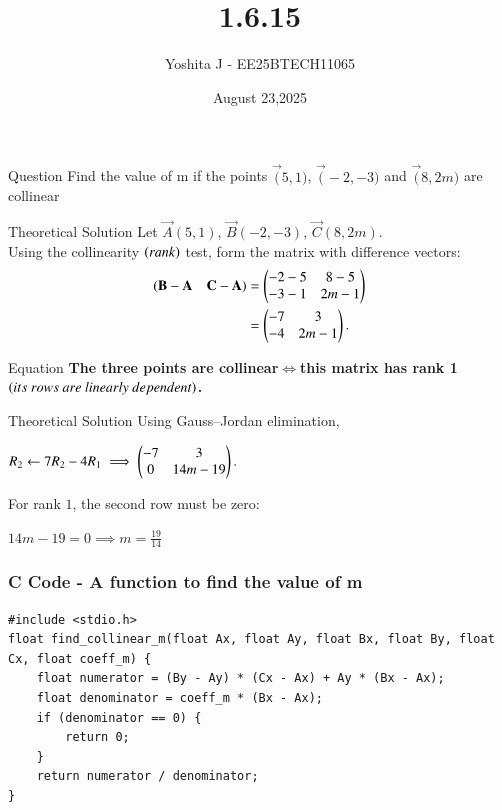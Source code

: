 \documentclass{beamer}
\begin{document}
\title 
{1.6.15}
\date{August 23,2025}


\author 
{Yoshita J - EE25BTECH11065}






\frame{\titlepage}
\begin{frame}{Question}
 Find the value of m if the points $\vec(5,1)$, $\vec(-2,-3)$ and $\vec(8,2m)$ are collinear
\end{frame}



\begin{frame}{Theoretical Solution}
Let $\vec{A}(5,1)$, $\vec{B}(-2,-3)$, $\vec{C}(8,2m)$.
\\
Using the collinearity $\left(rank\right)$ test, form the matrix with difference vectors:
\begin{align*}
    (\mathbf{B}-\mathbf{A} \quad \mathbf{C}-\mathbf{A}) &= \begin{pmatrix}-2-5 & 8-5 \\ -3-1 & 2m-1\end{pmatrix} \\
    &= \begin{pmatrix}-7 & 3 \\ -4 & 2m-1\end{pmatrix}.
\end{align*}
\end{frame}

\begin{frame}{Equation}
\textbf{The three points are collinear$\iff$this matrix has rank 1 $\brak{its\ rows\ are\ linearly\ dependent}$.\\}
\end{frame}
\begin{frame}{Theoretical Solution}
Using Gauss–Jordan elimination,
\begin{center}
 $R_2 \leftarrow 7R_2 - 4R_1 \implies \begin{pmatrix} -7 & 3 \\ 0 & 14m-19 \end{pmatrix}.$
 \end{center}

For rank $1$, the second row must be zero:
\begin{center}
$14m - 19 = 0 \implies m = \frac{19}{14}$
\end{center}
\end{frame}


\begin{frame}[fragile]
    \frametitle{C Code - A function to find the value of m}

    \begin{lstlisting}
#include <stdio.h>
float find_collinear_m(float Ax, float Ay, float Bx, float By, float Cx, float coeff_m) {
    float numerator = (By - Ay) * (Cx - Ax) + Ay * (Bx - Ax);
    float denominator = coeff_m * (Bx - Ax);
    if (denominator == 0) {  
        return 0; 
    }
    return numerator / denominator;
}

    \end{lstlisting}
\end{frame}
\end{document}
